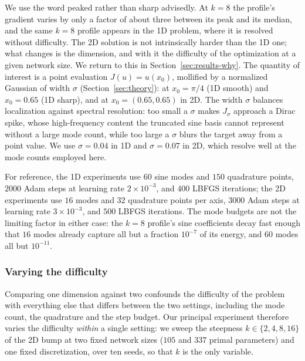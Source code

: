 \documentclass[preprint,11pt]{elsarticle}
\begin{document}
We use the word peaked rather than sharp advisedly. At $k = 8$ the profile's gradient varies by only a factor of about three between its peak and its median, and the same $k = 8$ profile appears in the 1D problem, where it is resolved without difficulty. The 2D solution is not intrinsically harder than the 1D one; what changes is the dimension, and with it the difficulty of the optimization at a given network size. We return to this in Section~\ref{sec:results-why}.
The quantity of interest is a point evaluation $J(u) = u(x_0)$, mollified by a normalized Gaussian of width $\sigma$ (Section~\ref{sec:theory}): at $x_0 = \pi/4$ (1D smooth) and $x_0 = 0.65$ (1D sharp), and at $x_0 = (0.65, 0.65)$ in 2D. The width $\sigma$ balances localization against spectral resolution: too small a $\sigma$ makes $J_\sigma$ approach a Dirac spike, whose high-frequency content the truncated sine basis cannot represent without a large mode count, while too large a $\sigma$ blurs the target away from a point value. We use $\sigma = 0.04$ in 1D and $\sigma = 0.07$ in 2D, which resolve well at the mode counts employed here.

For reference, the 1D experiments use $60$ sine modes and $150$ quadrature points, $2000$ Adam steps at learning rate $2 \times 10^{-3}$, and $400$ LBFGS iterations; the 2D experiments use $16$ modes and $32$ quadrature points per axis, $3000$ Adam steps at learning rate $3 \times 10^{-3}$, and $500$ LBFGS iterations. The mode budgets are not the limiting factor in either case: the $k = 8$ profile's sine coefficients decay fast enough that $16$ modes already capture all but a fraction $10^{-7}$ of its energy, and $60$ modes all but $10^{-11}$.

\subsubsection{Varying the difficulty}
\label{sec:setup-steepness}

Comparing one dimension against two confounds the difficulty of the problem with everything else that differs between the two settings, including the mode count, the quadrature and the step budget. Our principal experiment therefore varies the difficulty \emph{within} a single setting: we sweep the steepness $k \in \{2, 4, 8, 16\}$ of the 2D bump at two fixed network sizes ($105$ and $337$ primal parameters) and one fixed discretization, over ten seeds, so that $k$ is the only variable.
\end{document}
